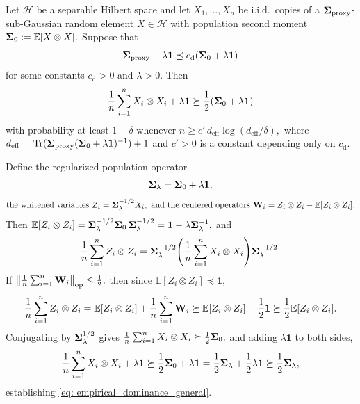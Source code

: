 \documentclass[mnsc]{informs3aa} %
\DeclareMathOperator{\Tr}{Tr}
\newcommand{\bSigma}{\bold{\Sigma}}
\newcommand{\idty}{\mathbf{1}}
\newcommand{\op}{\mathrm{op}}
\newcommand{\mH}{\mathcal H}
\begin{document}
\begin{lemma}\label{lem: empirical_dominance_general}
Let $\mH$ be a separable Hilbert space and let $X_1,\ldots,X_n$ be i.i.d.\ copies of a $\bSigma_{\mathrm{proxy}}$-sub-Gaussian random element $X\in\mH$ with population second moment $\bSigma_0:=\mathbb{E}[X\otimes X].$ Suppose that
\begin{equation}\label{eq: dominance_condition}
\bSigma_{\mathrm{proxy}}+\lambda\idty\preceq c_{\mathrm{d}}(\bSigma_0+\lambda\idty)
\end{equation}
for some constants $c_{\mathrm{d}}>0$ and $\lambda>0.$ Then
\begin{equation}\label{eq: empirical_dominance_general}
\frac{1}{n}\sum_{i=1}^n X_i\otimes X_i+\lambda\idty\succeq\frac{1}{2}(\bSigma_0+\lambda\idty)
\end{equation}
with probability at least $1-\delta$ whenever $n\geq c'\,d_{\mathrm{eff}}\log(d_{\mathrm{eff}}/\delta),$ where $d_{\mathrm{eff}}=\Tr(\bSigma_{\mathrm{proxy}}(\bSigma_0+\lambda\idty)^{-1})+1$ and $c'>0$ is a constant depending only on $c_{\mathrm{d}}.$
\end{lemma}
Define the regularized population operator \[\bSigma_\lambda=\bSigma_0+\lambda\idty,\]  \[\text{the whitened variables } Z_i=\bSigma_\lambda^{-1/2}X_i, \text{ and the centered operators } \bold{W}_i=Z_i\otimes Z_i-\mathbb{E}[Z_i\otimes Z_i].\] Then $\mathbb{E}[Z_i\otimes Z_i]=\bSigma_\lambda^{-1/2}\bSigma_0\,\bSigma_\lambda^{-1/2}=\idty-\lambda\bSigma_\lambda^{-1},$ and
\[\frac{1}{n}\sum_{i=1}^n Z_i\otimes Z_i=\bSigma_\lambda^{-1/2}\!\left(\frac{1}{n}\sum_{i=1}^n X_i\otimes X_i\right)\!\bSigma_\lambda^{-1/2}.\]
If $\left\|\frac{1}{n}\sum_{i=1}^n\bold{W}_i\right\|_{\op}\leq\frac{1}{2},$ then since $\mathbb{E}[Z_i\otimes Z_i]\preceq\idty,$
\[\frac{1}{n}\sum_{i=1}^n Z_i\otimes Z_i=\mathbb{E}[Z_i\otimes Z_i]+\frac{1}{n}\sum_{i=1}^n\bold{W}_i\succeq\mathbb{E}[Z_i\otimes Z_i]-\frac{1}{2}\idty\succeq\frac{1}{2}\mathbb{E}[Z_i\otimes Z_i].\]
Conjugating by $\bSigma_\lambda^{1/2}$ gives $\frac{1}{n}\sum_{i=1}^n X_i\otimes X_i\succeq\frac{1}{2}\bSigma_0,$ and adding $\lambda\idty$ to both sides,
\[\frac{1}{n}\sum_{i=1}^n X_i\otimes X_i+\lambda\idty\succeq\frac{1}{2}\bSigma_0+\lambda\idty=\frac{1}{2}\bSigma_\lambda+\frac{1}{2}\lambda\idty\succeq\frac{1}{2}\bSigma_\lambda,\]
establishing \eqref{eq: empirical_dominance_general}.
\end{document}
